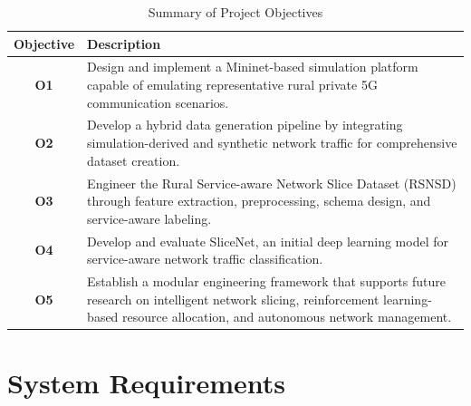 \documentclass[12pt,a4paper]{report}
\begin{document}
	
	
	\begin{table}[H]
		\centering
		\caption{Summary of Project Objectives}
		\label{tab:objectives}
		
		\begin{tabular}{|c|p{11cm}|}
			\hline
			
			\textbf{Objective} &
			\textbf{Description}
			\\
			\hline
			
			\textbf{O1} &
			Design and implement a Mininet-based simulation platform capable of emulating representative rural private 5G communication scenarios.
			\\
			\hline
			
			\textbf{O2} &
			Develop a hybrid data generation pipeline by integrating simulation-derived and synthetic network traffic for comprehensive dataset creation.
			\\
			\hline
			
			\textbf{O3} &
			Engineer the Rural Service-aware Network Slice Dataset (RSNSD) through feature extraction, preprocessing, schema design, and service-aware labeling.
			\\
			\hline
			
			\textbf{O4} &
			Develop and evaluate SliceNet, an initial deep learning model for service-aware network traffic classification.
			\\
			\hline
			
			\textbf{O5} &
			Establish a modular engineering framework that supports future research on intelligent network slicing, reinforcement learning-based resource allocation, and autonomous network management.
			\\
			\hline
			
		\end{tabular}
		
	\end{table}
	\section{System Requirements}
	\label{sec:requirements}
	
\end{document}
